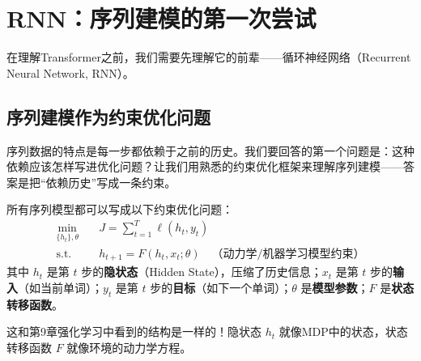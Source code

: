 \section{RNN：序列建模的第一次尝试}

在理解Transformer之前，我们需要先理解它的前辈——循环神经网络（Recurrent Neural Network, RNN）。

\subsection{序列建模作为约束优化问题}

序列数据的特点是每一步都依赖于之前的历史。我们要回答的第一个问题是：这种依赖应该怎样写进优化问题？让我们用熟悉的约束优化框架来理解序列建模——答案是把“依赖历史”写成一条约束。

\begin{keyidea}[序列模型的统一形式]
所有序列模型都可以写成以下约束优化问题：
\begin{equation}
    \begin{aligned}
        \min_{\{h_t\}, \theta} \quad & J = \sum_{t=1}^{T} \ell(h_t, y_t) \\
        \text{s.t.} \quad & h_{t+1} = F(h_t, x_t; \theta) \quad \text{（动力学/机器学习模型约束）}
    \end{aligned}
\end{equation}
其中 $h_t$ 是第 $t$ 步的\textbf{隐状态}（Hidden State），压缩了历史信息；$x_t$ 是第 $t$ 步的\textbf{输入}（如当前单词）；$y_t$ 是第 $t$ 步的\textbf{目标}（如下一个单词）；$\theta$ 是\textbf{模型参数}；$F$ 是\textbf{状态转移函数}。
\end{keyidea}

这和第9章强化学习中看到的结构是一样的！隐状态 $h_t$ 就像MDP中的状态，状态转移函数 $F$ 就像环境的动力学方程。


